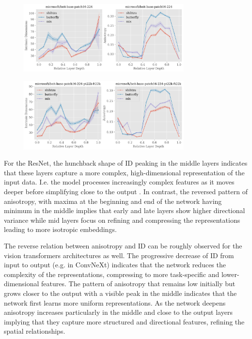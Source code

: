 \documentclass[
  11pt,
  a4paper,
  onecolumn]{article}
\begin{document}
\begin{figure}[h!]
\centering
\includegraphics[width=0.78\textwidth]{figures/microsoft-beit-base-patch16-224_topology.png}
\end{figure}

\begin{figure}[h!]
\centering
\includegraphics[width=0.78\textwidth]{figures/microsoft-beit-base-patch16-224-pt22k-ft22k_topology.png}
\end{figure}

For the ResNet, the hunchback shape of ID peaking in the middle layers indicates that these layers capture a more complex, high-dimensional representation of the input data. I.e. the model processes increasingly complex features as it moves deeper before simplifying close to the output \cite{ansuini2019intrinsic}. In contrast, the reversed pattern of anisotropy, with maxima at the beginning and end of the network having minimum in the middle implies that early and late layers show higher directional variance while mid layers focus on refining and compressing the representations leading to more isotropic embeddings. 

The reverse relation between anisotropy and ID can be roughly observed for the  vision transformers architectures as well. The progressive decrease of ID from input to output (e.g. in ConvNeXt) indicates that the network reduces the complexity of the representations, compressing to more task-specific and lower-dimensional features. The pattern of anisotropy that remains low initially but grows closer to the output with a visible peak in the middle indicates that the network first learns more uniform representations. As the network deepens anisotropy increases particularly in the middle and close to the output layers implying that they capture more structured and directional features, refining the spatial relationships.
\end{document}
